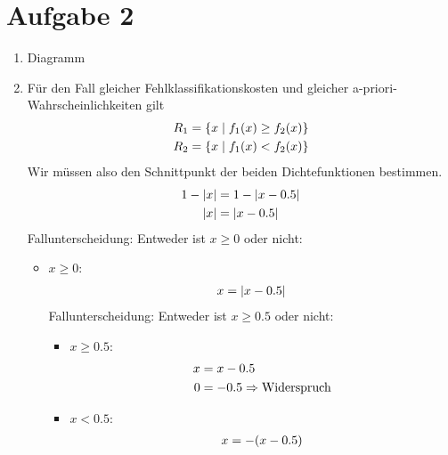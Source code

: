 \documentclass{article}
\begin{document}
	\section*{Aufgabe 2}
	\begin{enumerate}[label=(\alph*)]
		\item Diagramm
		\begin{center}
		\end{center}
		\item Für den Fall gleicher Fehlklassifikationskosten und gleicher a-priori-Wahrscheinlichkeiten gilt
		\begin{align}
			R_1 &= \left\lbrace x\mid f_1(x) \ge f_2(x)\right\rbrace \notag \\
			R_2 &= \left\lbrace x\mid f_1(x) < f_2(x)\right\rbrace \notag
		\end{align}
		Wir müssen also den Schnittpunkt der beiden Dichtefunktionen bestimmen.
		\begin{align}
			1-\vert x\vert &= 1- \vert x-0.5\vert \notag \\
			\vert x\vert &= \vert x-0.5\vert \notag
		\end{align}
		Fallunterscheidung: Entweder ist $x\ge 0$ oder nicht:
		\begin{itemize}
			\item $x\ge 0$:
			\begin{align}
				x = \vert x-0.5\vert \notag
			\end{align}
			Fallunterscheidung: Entweder ist $x\ge 0.5$ oder nicht:
			\begin{itemize}
				\item $x\ge 0.5$:
				\begin{align}
					x &= x-0.5 \notag \\
					0 &= -0.5 \Rightarrow \text{Widerspruch} \notag
				\end{align}
				\item $x<0.5$:
				\begin{align}
					x &= -(x-0.5) \notag \\

\end{align}
\end{itemize}
\end{itemize}
\end{enumerate}
\end{document}
